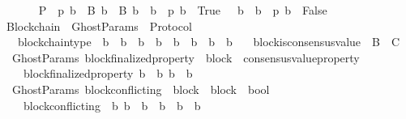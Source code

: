 \begin{isabellebody}
\ \ \isanewline
\ \ \ \ {\isachardoublequoteopen}P\ {\isasymequiv}\ {\isacharbraceleft}p{\isachardot}\ {\isasymexists}{\isacharbang}b\ {\isasymin}\ B{\isachardot}\ {\isasymforall}b{\isacharprime}\ {\isasymin}\ B{\isachardot}\ {\isacharparenleft}b\ {\isasymdownharpoonright}\ b{\isacharprime}\ {\isasymlongrightarrow}\ p\ b{\isacharprime}\ {\isacharequal}\ True{\isacharparenright}\ {\isasymand}\ {\isasymnot}\ {\isacharparenleft}b\ {\isasymdownharpoonright}\ b{\isacharprime}\ {\isasymlongrightarrow}\ p\ b{\isacharprime}\ {\isacharequal}\ False{\isacharparenright}{\isacharbraceright}{\isachardoublequoteclose}\isanewline
\isanewline
\isanewline
{}\isamarkupfalse%
\ Blockchain\ {\isacharequal}\ GhostParams\ {\isacharplus}\ Protocol\ {\isacharplus}\isanewline
\ \ \ blockchain{\isacharunderscore}type\ {\isacharcolon}\ {\isachardoublequoteopen}b{\isacharprime}\ {\isasymdownharpoonright}\ b\ {\isasymand}\ b{\isacharprime}{\isacharprime}\ {\isasymdownharpoonright}\ b\ {\isasymLongrightarrow}\ {\isacharparenleft}b{\isacharprime}\ {\isasymdownharpoonright}\ b{\isacharprime}{\isacharprime}\ {\isasymor}\ b{\isacharprime}{\isacharprime}\ {\isasymdownharpoonright}\ b{\isacharprime}{\isacharparenright}{\isachardoublequoteclose}\isanewline
\ \ \ block{\isacharunderscore}is{\isacharunderscore}consensus{\isacharunderscore}value\ {\isacharcolon}\ {\isachardoublequoteopen}B\ {\isacharequal}\ C{\isachardoublequoteclose}\isanewline
\isanewline
{}\isamarkupfalse%
\ {\isacharparenleft}\ GhostParams{\isacharparenright}\ block{\isacharunderscore}finalized{\isacharunderscore}property\ {\isacharcolon}{\isacharcolon}\ {\isachardoublequoteopen}block\ {\isasymRightarrow}\ consensus{\isacharunderscore}value{\isacharunderscore}property{\isachardoublequoteclose}\isanewline
\ \ \isanewline
\ \ \ \ {\isachardoublequoteopen}block{\isacharunderscore}finalized{\isacharunderscore}property\ b\ {\isacharequal}\ {\isacharparenleft}{\isasymlambda}b{\isacharprime}{\isachardot}\ b\ {\isasymdownharpoonright}\ b{\isacharprime}{\isacharparenright}{\isachardoublequoteclose}\isanewline
\isanewline
{}\isamarkupfalse%
\ {\isacharparenleft}\ GhostParams{\isacharparenright}\ block{\isacharunderscore}conflicting\ {\isacharcolon}{\isacharcolon}\ {\isachardoublequoteopen}{\isacharparenleft}block\ {\isacharasterisk}\ block{\isacharparenright}\ {\isasymRightarrow}\ bool{\isachardoublequoteclose}\isanewline
\ \ \isanewline
\ \ \ \ {\isachardoublequoteopen}block{\isacharunderscore}conflicting\ {\isacharequal}\ {\isacharparenleft}{\isasymlambda}{\isacharparenleft}b{}{\isacharcomma}\ b{}{\isacharparenright}{\isachardot}\ {\isasymnot}\ {\isacharparenleft}b{}\ {\isasymdownharpoonright}\ b{}\ {\isasymor}\ b{}\ {\isasymdownharpoonright}\ b{}{\isacharparenright}{\isacharparenright}{\isachardoublequoteclose}\isanewline

\end{isabellebody}
